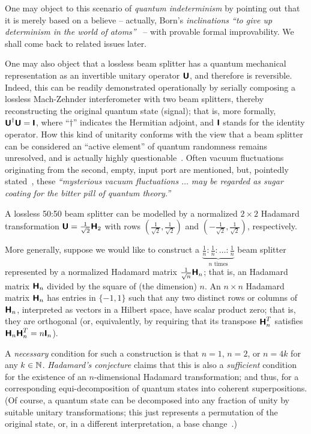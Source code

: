 \documentclass{llncs}
\begin{document}
One may object to this scenario of {\em quantum indeterminism} by pointing out
that it is merely based on a believe
--
actually, Born's {\em inclinations
``to give up determinism in the world of atoms''}~\cite[p.~866]{born-26-1}
--
with provable formal improvability.
We shall come back to related issues later.

One may also object that a lossless beam splitter has a quantum mechanical
representation as an invertible unitary operator $\textsf{\textbf{U}}$,
and therefore is reversible.
Indeed, this can be readily demonstrated operationally by serially composing a lossless Mach-Zehnder interferometer with two beam splitters,
thereby reconstructing the original quantum state (signal); that is, more formally,
$\textsf{\textbf{U}}^\dagger \textsf{\textbf{U}}=\textsf{\textbf{I}}$, where ``$\dagger$''
indicates the Hermitian adjoint, and $\textsf{\textbf{I}}$ stands for the identity operator.
How this kind of unitarity conforms with the view that a beam splitter can be considered an ``active element'' of quantum randomness remains unresolved,
and is actually highly questionable~\cite{everett,wigner:mb}.
Often vacuum fluctuations originating from the second, empty, input port are mentioned,
but, pointedly stated~\cite[p.~249]{chau}, these {\em ``mysterious vacuum fluctuations $\ldots$ may be regarded as sugar coating for the bitter pill of
quantum theory.''}

A lossless 50:50 beam splitter can be modelled by a normalized $2 \times 2$
Hadamard transformation $\textsf{\textbf{U}}=  \frac{1}{\sqrt{2}}  \textsf{\textbf{H}}_2$
with rows $( \frac{1}{\sqrt{2}} , \frac{1}{\sqrt{2}} )$ and  $(- \frac{1}{\sqrt{2}} , \frac{1}{\sqrt{2}} )$, respectively.

More generally,
suppose we would like to construct a
$\underbrace{\frac{1}{n} : \frac{1}{n} : \ldots : \frac{1}{n}}_{n \text{ times}}$
beam splitter represented by a normalized  Hadamard matrix $\frac{1}{\sqrt{n}} \textsf{\textbf{H}}_n$;
that is, an Hadamard matrix $\textsf{\textbf{H}}_n$ divided by the square of (the dimension) $n$.
An $n \times n$ Hadamard matrix $\textsf{\textbf{H}}_n$ has entries in $\{-1,1\}$ such that any two distinct rows or columns of
$\textsf{\textbf{H}}_n$, interpreted as vectors in a Hilbert space,
have scalar product zero; that is, they are orthogonal
(or, equivalently, by requiring that its transpose $\textsf{\textbf{H}}_n^T$ satisfies $\textsf{\textbf{H}}_n \textsf{\textbf{H}}_n^T= n\textsf{\textbf{I}}_n$).

A {\em necessary} condition for such a construction is that $n=1$, $n=2$, or $n=4k$ for any $k\in {\Bbb N}$.
{\em Hadamard's conjecture} claims that this is also a {\em sufficient} condition for the existence of an $n$-dimensional Hadamard transformation;
and thus, for a corresponding equi-decomposition of quantum states into coherent superpositions.
(Of course, a quantum state can be decomposed into any fraction of unity by suitable unitary transformations; this just represents a permutation of the original state,
or, in a different interpretation, a base change~\cite{Schwinger.60}.)
\end{document}
